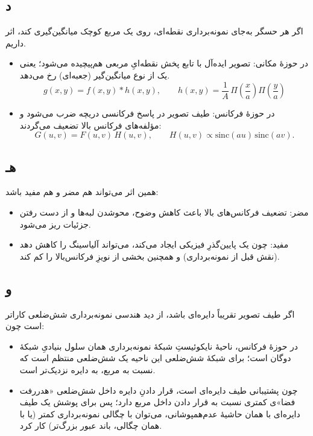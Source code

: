 \subsection*{د}
اگر هر حسگر به‌جای نمونه‌برداری نقطه‌ای، روی یک مربع کوچک میانگین‌گیری کند، اثر  داریم.

\begin{itemize}
    \item در حوزهٔ مکانی: تصویر ایده‌آل با تابع پخش نقطه‌ایِ مربعی هم‌پیچیده می‌شود؛ یعنی یک  از نوع میانگین‌گیر (جعبه‌ای) رخ می‌دهد.
    \[
    g(x,y) = f(x,y) * h(x,y), \qquad
    h(x,y)=\frac{1}{A}\,\Pi\!\left(\frac{x}{a}\right)\Pi\!\left(\frac{y}{a}\right)
    \]
    \item در حوزهٔ فرکانس: طیف تصویر در پاسخ فرکانسی دریچه ضرب می‌شود و مؤلفه‌های فرکانس بالا تضعیف می‌گردند:
    \[
    G(u,v)=F(u,v)\,H(u,v),\qquad
    H(u,v)\propto \mathrm{sinc}(au)\,\mathrm{sinc}(av).
    \]
\end{itemize}

\subsection*{هـ}
همین اثر می‌تواند هم مضر و هم مفید باشد:
\begin{itemize}
    \item مضر: تضعیف فرکانس‌های بالا باعث کاهش وضوح، محوشدن لبه‌ها و از دست رفتن جزئیات ریز می‌شود.
    \item مفید: چون یک پایین‌گذرِ فیزیکی ایجاد می‌کند، می‌تواند آلیاسینگ را کاهش دهد (نقش  قبل از نمونه‌برداری) و همچنین بخشی از نویزِ فرکانس‌بالا را کم کند.
\end{itemize}

\subsection*{و}
اگر طیف تصویر تقریباً دایره‌ای باشد، از دید هندسی نمونه‌برداری شش‌ضلعی کاراتر است چون:
\begin{itemize}
    \item در حوزهٔ فرکانس، ناحیهٔ نایکوئیستِ شبکهٔ نمونه‌برداری همان سلول بنیادیِ شبکهٔ دوگان است؛ برای شبکهٔ شش‌ضلعی این ناحیه یک شش‌ضلعی منتظم است که نسبت به مربع، به دایره نزدیک‌تر است.
    \item چون پشتیبانی طیف دایره‌ای است، قرار دادنِ دایره داخل شش‌ضلعی «هدررفت فضا»ی کمتری نسبت به قرار دادن داخل مربع دارد؛ پس برای پوشش یک طیف دایره‌ای با همان حاشیهٔ عدم‌همپوشانی، می‌توان با چگالی نمونه‌برداری کمتر (یا با همان چگالی، باند عبور بزرگ‌تر) کار کرد.
\end{itemize}